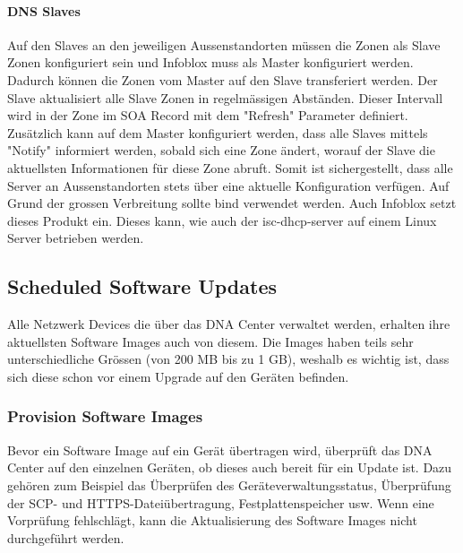 \paragraph{DNS Slaves}

Auf den Slaves an den jeweiligen Aussenstandorten müssen die Zonen als Slave Zonen konfiguriert sein und Infoblox muss als Master konfiguriert werden. Dadurch können die Zonen vom Master auf den Slave transferiert werden. Der Slave aktualisiert alle Slave Zonen in regelmässigen Abständen. Dieser Intervall wird in der Zone im SOA Record mit dem "Refresh" Parameter definiert.
Zusätzlich kann auf dem Master konfiguriert werden, dass alle Slaves mittels "Notify" informiert werden, sobald sich eine Zone ändert, worauf der Slave die aktuellsten Informationen für diese Zone abruft. Somit ist sichergestellt, dass alle Server an Aussenstandorten stets über eine aktuelle Konfiguration verfügen.
Auf Grund der grossen Verbreitung sollte bind verwendet werden. Auch Infoblox setzt dieses Produkt ein. Dieses kann, wie auch der isc-dhcp-server auf einem Linux Server betrieben werden.

\subsection{Scheduled Software Updates}
Alle Netzwerk Devices die über das DNA Center verwaltet werden, erhalten ihre aktuellsten Software Images auch von diesem. Die Images haben teils sehr unterschiedliche Grössen (von 200 MB bis zu 1 GB), weshalb es wichtig ist, dass sich diese schon vor einem Upgrade auf den Geräten befinden. 


\subsubsection{Provision Software Images}
Bevor ein Software Image auf ein Gerät übertragen wird, überprüft das DNA Center auf den einzelnen Geräten, ob dieses auch bereit für ein Update ist. Dazu gehören zum Beispiel das Überprüfen des Geräteverwaltungsstatus, Überprüfung der SCP- und HTTPS-Dateiübertragung, Festplattenspeicher usw. Wenn eine Vorprüfung fehlschlägt, kann die Aktualisierung des Software Images nicht durchgeführt werden. \\

